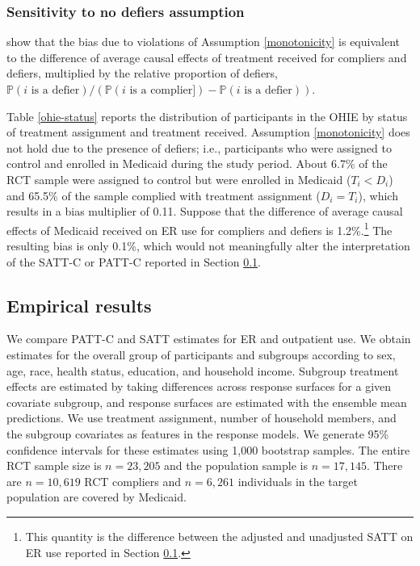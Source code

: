 \documentclass[hidelinks,12pt]{article}
\newcommand{\pr}{\mathbb{P}} %
\begin{document}
{{\color{red}
\subsubsection{Sensitivity to no defiers assumption} \label{sens-defiers}
}

\citet{Angrist1996} show that the bias due to violations of Assumption \ref{monotonicity} is equivalent to the difference of average causal effects of treatment received for compliers and defiers, multiplied by the relative proportion of defiers, 
$\pr(i\text{ is a defier}) / (\pr(i\text{ is a complier]}) - \pr(i\text{ is a defier})).$

Table \ref{ohie-status} reports the distribution of participants in the OHIE by status of treatment assignment and treatment received. Assumption \ref{monotonicity} does not hold due to the presence of defiers; i.e., participants who were assigned to control and enrolled in Medicaid during the study period. About 6.7\% of the RCT sample were assigned to control but were enrolled in Medicaid ($T_i < D_i$) and 65.5\% of the sample complied with treatment assignment ($D_i = T_i$), which results in a bias multiplier of 0.11. Suppose that the difference of average causal effects of Medicaid received on ER use for compliers and defiers is 1.2\%.\footnote{This quantity is the difference between the adjusted and unadjusted SATT on ER use reported in Section \ref{results}.} The resulting bias is only 0.1\%, which would not meaningfully alter the interpretation of the SATT-C or PATT-C reported in Section \ref{results}. 
 
\subsection{Empirical results}\label{results}

We compare PATT-C and SATT estimates for ER and outpatient use. We obtain estimates for the overall group of participants and subgroups according to sex, age, race, health status, education, and household income. Subgroup treatment effects are estimated by taking differences across response surfaces for a given covariate subgroup, and response surfaces are estimated with {\color{red}the ensemble mean predictions}. We use treatment assignment, number of household members, and the subgroup covariates as features in the response models. We generate 95\% confidence intervals for these estimates using 1,000 bootstrap samples. The entire RCT sample size is $n=23,205$ and the population sample is {\color{red}$n=17,145$}. There are $n=10,619$ RCT compliers and {\color{red}$n=6,261$ individuals in the target population are covered by Medicaid}. 

}
\end{document}
